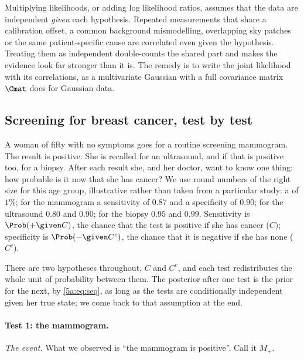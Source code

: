 \begin{pitfall}
Multiplying likelihoods, or adding log likelihood ratios, assumes that the data are
independent \emph{given} each hypothesis. Repeated measurements that share a
calibration offset, a common background mismodelling, overlapping sky patches or the
same patient-specific cause are correlated even given the hypothesis. Treating them as
independent double-counts the shared part and makes the evidence look far stronger
than it is. The remedy is to write the joint likelihood with its correlations, as a
multivariate Gaussian with a full covariance matrix $\Cmat$ does for Gaussian data.
\end{pitfall}

\subsection{Screening for breast cancer, test by test}
\label{5a:sec:screening}

A woman of fifty with no symptoms goes for a routine screening mammogram. The result
is positive. She is recalled for an ultrasound, and if that is positive too, for a
biopsy. After each result she, and her doctor, want to know one thing: how probable is
it now that she has cancer? We use round numbers of the right size for this age group,
illustrative rather than taken from a particular study: a 
 of $1\%$; for the mammogram a sensitivity of $0.87$ and a specificity of
$0.90$; for the ultrasound $0.80$ and $0.90$; for the biopsy $0.95$ and $0.99$.
Sensitivity is $\Prob(+\given C)$, the chance that the test is positive if she has
cancer ($C$); specificity is $\Prob(-\given C^c)$, the chance that it is negative if
she has none ($C^c$).

There are two hypotheses throughout, $C$ and $C^c$, and each test redistributes the
whole unit of probability between them. The posterior after one test is the prior for
the next, by \eqref{5a:eq:seq}, as long as the tests are conditionally independent
given her true state; we come back to that assumption at the end.

\paragraph{Test 1: the mammogram.}
\emph{The event.} What we observed is ``the mammogram is positive''. Call it $M_+$.

